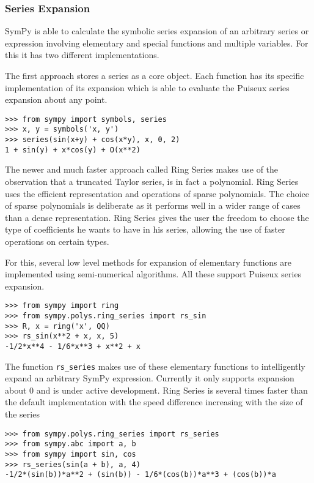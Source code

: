 \subsubsection{Series Expansion}

SymPy is able to calculate the symbolic series expansion of an arbitrary series
or expression involving elementary and special functions and multiple
variables. For this it has two different implementations.

The first approach stores a series as a core object. Each function has its
specific implementation of its expansion which is able to evaluate the Puiseux
series expansion about any point.

\begin{verbatim}
>>> from sympy import symbols, series
>>> x, y = symbols('x, y')
>>> series(sin(x+y) + cos(x*y), x, 0, 2)
1 + sin(y) + x*cos(y) + O(x**2)
\end{verbatim}

The newer and much faster approach called Ring Series makes use of the
observation that a truncated Taylor series, is in fact a polynomial.
Ring Series uses the efficient representation and operations of sparse
polynomials. The choice of sparse polynomials is deliberate as it performs
well in a wider range of cases than a dense representation. Ring Series gives 
the user the freedom to choose the type of coefficients he wants to have in
his series, allowing the use of faster operations on certain types.

For this, several low level methods for expansion of elementary functions are
implemented using semi-numerical algorithms. All these support Puiseux series
expansion.

\begin{verbatim}
>>> from sympy import ring
>>> from sympy.polys.ring_series import rs_sin
>>> R, x = ring('x', QQ)
>>> rs_sin(x**2 + x, x, 5)
-1/2*x**4 - 1/6*x**3 + x**2 + x
\end{verbatim}

The function \texttt{rs\_series} makes use of these elementary functions to
intelligently expand an arbitrary SymPy expression. Currently it only supports
expansion about 0 and is under active development. Ring Series is several times
faster than the default implementation with the speed difference increasing
with the size of the series

\begin{verbatim}
>>> from sympy.polys.ring_series import rs_series
>>> from sympy.abc import a, b
>>> from sympy import sin, cos
>>> rs_series(sin(a + b), a, 4)
-1/2*(sin(b))*a**2 + (sin(b)) - 1/6*(cos(b))*a**3 + (cos(b))*a
\end{verbatim}

